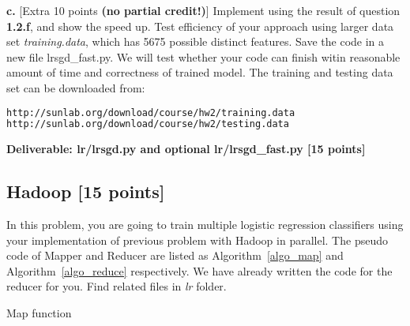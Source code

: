 \documentclass[12pt]{article}
\begin{document}
\textbf{c.} [Extra 10 points \textbf{(no partial credit!)}] Implement using the result of question \textbf{1.2.f}, and show the speed up. Test efficiency of your approach using larger data set \textit{training.data}, which has 5675 possible distinct features. Save the code in a new file lrsgd\_fast.py. We will test whether your code can finish witin reasonable amount of time and correctness of trained model. The training and testing data set can be downloaded from:

\begin{lstlisting}[frame=single,language=bash]
http://sunlab.org/download/course/hw2/training.data
http://sunlab.org/download/course/hw2/testing.data
\end{lstlisting}



\textbf{Deliverable: lr/lrsgd.py and optional lr/lrsgd\_fast.py [15 points]}

\subsection{Hadoop [15 points]}
In this problem, you are going to train multiple logistic regression classifiers using your implementation of previous problem with Hadoop in parallel. The pseudo code of Mapper and Reducer are listed as Algorithm~\ref{algo_map} and Algorithm~\ref{algo_reduce} respectively. We have already written the code for the reducer for you. Find related files in \textit{lr} folder.

\begin{algorithm}
\BlankLine
{}
\caption{Map function}\label{algo_map}
\end{algorithm}
\end{document}
